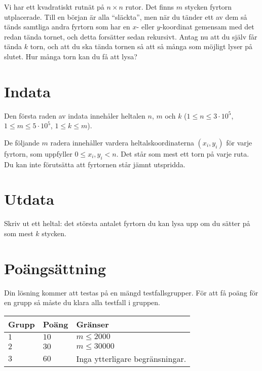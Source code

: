 
Vi har ett kvadratiskt rutnät på $n \times n$ rutor. Det finns $m$ stycken fyrtorn utplacerade.
Till en början är alla ``släckta'', men när du tänder ett av dem så tänds samtliga andra fyrtorn
som har en $x$- eller $y$-koordinat gemensam med det redan tända tornet, och detta forsätter
sedan rekursivt. Antag nu att du själv får tända $k$ torn, och att du ska tända tornen så att så
många som möjligt lyser på slutet. Hur många torn kan du få att lysa?

\section*{Indata}
Den första raden av indata innehåler heltalen $n$, $m$ och $k$ ($1 \leq n \leq 3 \cdot 10^5$, $1 \leq m \leq 5 \cdot 10^5$, $1 \leq k \leq m$).

De följande $m$ radera innehåller vardera heltalskoordinaterna $(x_i, y_i)$ för varje fyrtorn, som uppfyller $0 \le x_i, y_i < n$.
Det står som mest ett torn på varje ruta. Du kan inte förutsätta att fyrtornen står jämnt utspridda.

\section*{Utdata}
Skriv ut ett heltal: det största antalet fyrtorn du kan lysa upp om du sätter på som mest $k$ stycken.


\section*{Poängsättning}
Din lösning kommer att testas på en mängd testfallsgrupper.
För att få poäng för en grupp så måste du klara alla testfall i gruppen.

\noindent
\begin{tabular}{| l | l | p{12cm} |}
  \hline
  \textbf{Grupp} & \textbf{Poäng} & \textbf{Gränser} \\ \hline
  $1$   & $10$        & $m \leq 2000$ \\ \hline
  $2$   & $30$        & $m \leq 30000$ \\ \hline
  $3$   & $60$        & Inga ytterligare begränsningar. \\ \hline
\end{tabular}

